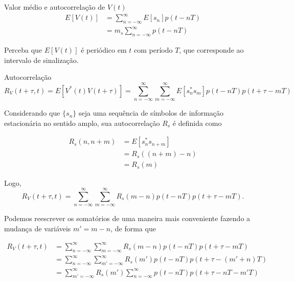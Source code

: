 \documentclass[
  ignorenonframetext,
]{beamer}
\begin{document}
\begin{frame}{Valor médio e autocorrelação de \(V(t)\)}
\label{valor-muxe9dio}
\begin{equation}
\begin{aligned}
E[V(t)] &=\sum_{n=-\infty}^{\infty} E\left[s_{n}\right] p(t-n T) \\
&=m_{s} \sum_{n=-\infty}^{\infty} p(t-n T)
\end{aligned}
\end{equation}

Perceba que \(E[V(t)]\) é periódico em \(t\) com período \(T\), que
corresponde ao intervalo de sinalização.
\end{frame}

\begin{frame}{Autocorrelação}
\label{autocorrelauxe7uxe3o}
\begin{equation}
R_{V}(t+\tau, t)=E\left[V^{*}(t) V(t+\tau)\right]=\sum_{n=-\infty}^{\infty} \sum_{m=-\infty}^{\infty} E\left[s_{n}^{*} s_{m}\right] p(t-nT) p(t+\tau-mT)
\end{equation}

Considerando que \(\{s_n\}\) seja uma sequência de símbolos de
informação estacionária no sentido amplo, sua autocorrelação \(R_{s}\) é
definida como

\begin{equation}
\begin{aligned}
R_{s}(n,n+m)&=E\left[s_{n}^{*}s_{n+m}\right]\nonumber\\
        &=R_{s}((n+m)-n)\nonumber\\
        &=R_{s}(m)
\end{aligned}
\end{equation}

Logo, \begin{equation}
R_{V}(t+\tau, t) =\sum_{n=-\infty}^{\infty} \sum_{m=-\infty}^{\infty} R_{s}(m-n) p(t-nT) p(t+\tau-mT).
\end{equation}

Podemos reescrever os somatórios de uma maneira mais conveniente fazendo
a mudança de variáveis \(m'= m-n\), de forma que

\begin{equation}
\begin{aligned}
R_{V}(t+\tau, t) &=\sum_{n=-\infty}^{\infty} \sum_{m=-\infty}^{\infty} R_{s}(m-n) p(t-nT) p(t+\tau-mT)\nonumber\\
                 &=\sum_{n=-\infty}^{\infty} \sum_{m'=-\infty}^{\infty} R_{s}(m') p(t-nT) p(t+\tau-(m'+n)T)\nonumber\\
                 &=\sum_{m'=-\infty}^{\infty} R_{s}(m') \sum_{n=-\infty}^{\infty} p(t-nT) p(t+\tau -nT -m'T)
\end{aligned}
\end{equation}


\end{frame}
\end{document}
